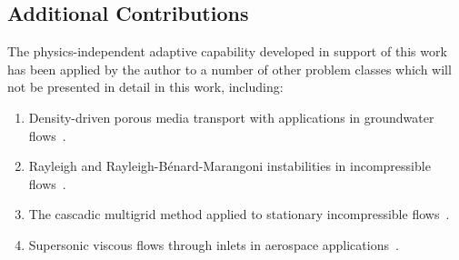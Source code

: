 \subsection{Additional Contributions}
The physics-independent adaptive capability developed in support of this work has been applied by the author to a number of other problem classes which will not be presented in detail in this work, including:
\begin{enumerate}
  \tightlist
  \item Density-driven porous media transport with applications in groundwater flows~\cite{modelling_error}.
  \item Rayleigh and Rayleigh-B\'{e}nard-Marangoni instabilities in incompressible flows~\cite{carey_world_scientific_2000}.
  \item The cascadic multigrid method applied to stationary incompressible flows~\cite{kirk_lipnikov_cmg}.
  \item Supersonic viscous flows through inlets in aerospace applications~\cite{carey_bail_2004}.
\end{enumerate}




